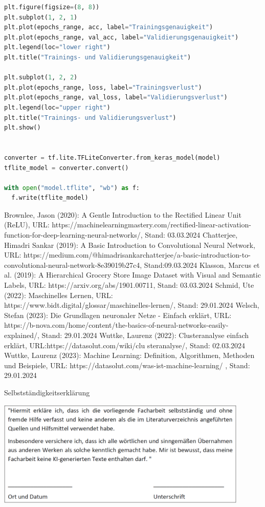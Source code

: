 \documentclass[11pt,oneside]{report}
\begin{document}
\begin{lstlisting}[language=Python]
plt.figure(figsize=(8, 8))
plt.subplot(1, 2, 1)
plt.plot(epochs_range, acc, label="Trainingsgenauigkeit")
plt.plot(epochs_range, val_acc, label="Validierungsgenauigkeit")
plt.legend(loc="lower right")
plt.title("Trainings- und Validierungsgenauigkeit")

plt.subplot(1, 2, 2)
plt.plot(epochs_range, loss, label="Trainingsverlust")
plt.plot(epochs_range, val_loss, label="Validierungsverlust")
plt.legend(loc="upper right")
plt.title("Trainings- und Validierungsverlust")
plt.show()


converter = tf.lite.TFLiteConverter.from_keras_model(model)
tflite_model = converter.convert()

with open("model.tflite", "wb") as f:
  f.write(tflite_model)

\end{lstlisting}



\begin{thebibliography}{}
	\bibitem{}Brownlee, Jason (2020): A Gentle Introduction to the Rectified Linear Unit (ReLU), URL: https://machinelearningmastery.com/rectified-linear-activation-function-for-deep-learning-neural-networks/, Stand: 03.03.2024
	\bibitem{}Chatterjee, Himadri Sankar (2019): A Basic Introduction to Convolutional Neural Network, URL: https://medium.com/@himadrisankarchatterjee/a-basic-introduction-to-convolutional-neural-network-8e39019b27c4, Stand:09.03.2024
	\bibitem{}Klasson, Marcus et al. (2019): A Hierarchical Grocery Store Image Dataset with Visual and Semantic Labels, URL: https://arxiv.org/abs/1901.00711, Stand: 03.03.2024
	\bibitem{}Schmid, Ute (2022): Maschinelles Lernen, URL: https://www.bidt.digital/glossar/maschinelles-lernen/, Stand: 29.01.2024
	\bibitem{}Welsch, Stefan (2023): Die Grundlagen neuronaler Netze - Einfach erklärt, URL: https://b-nova.com/home/content/the-basics-of-neural-networks-easily-explained/, Stand: 29.01.2024
	\bibitem{}Wuttke, Laurenz (2022): Clusteranalyse einfach erklärt, URL:https://datasolut.com/wiki/clu steranalyse/, Stand: 02.03.2024
	\bibitem{}Wuttke, Laurenz (2023): Machine Learning: Definition, Algorithmen, Methoden und Beispiele, URL: https://datasolut.com/was-ist-machine-learning/ , Stand: 29.01.2024
\end{thebibliography}


\newpage

\Large
Selbstständigkeitserklärung
\vspace{0.5cm}

\includegraphics[width=0.9\textwidth]{selbststaendigkeitserklaerung}
\end{document}
